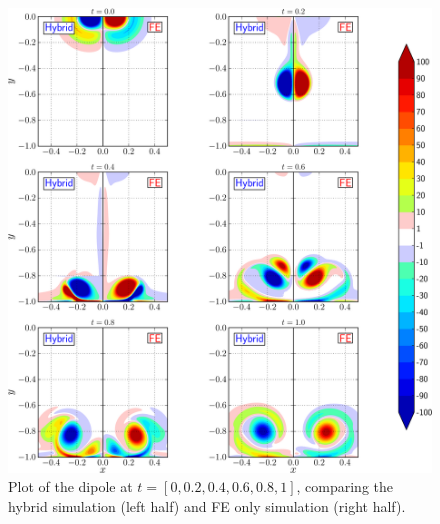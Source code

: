 	\begin{figure}[!p]
	\centering
	\includegraphics[width=\linewidth]{./figures/validation/cbColl/hybrid_doubleMonolope_contourfComparisonNew_compressed-crop.png}
	\caption{Plot of the dipole at $t = [0, 0.2, 0.4, 0.6, 0.8, 1]$, comparing the hybrid simulation (left half) and FE only simulation (right half).}
	\label{fig:hybrid_doubleMonolope_contourfComparison}
	\end{figure}

